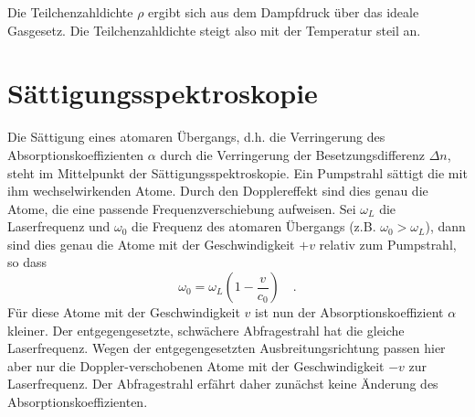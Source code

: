 Die Teilchenzahldichte $\rho$ ergibt sich aus dem Dampfdruck über das ideale Gasgesetz. Die Teilchenzahldichte steigt also mit der Temperatur steil an.


\begin{questions}
\end{questions}


\section{Sättigungsspektroskopie}

\begin{marginfigure}[0mm]
	\caption{oben: Ein Laser der Frequenz $\omega = \omega_0 (1 - v_0/c_0)$ brennt ein Loch in die ansonsten Maxwell-förmige Geschwindigkeitsverteilung der Atome im Grundzustand. unten: Dies führt zum Lamb-Dip im Absorptionsspektrum des gegenläufigen Abfrage-Strahls.}
\end{marginfigure}

Die Sättigung eines atomaren Übergangs, d.h. die Verringerung des Absorptionskoeffizienten $\alpha$ durch die Verringerung der Besetzungsdifferenz $\Delta n$, steht im Mittelpunkt der Sättigungsspektroskopie.  Ein Pumpstrahl sättigt die mit ihm wechselwirkenden Atome. Durch den Dopplereffekt sind dies genau die Atome, die eine passende Frequenzverschiebung aufweisen. Sei $\omega_L$ die Laserfrequenz und $\omega_0$ die Frequenz des atomaren Übergangs (z.B. $\omega_0 > \omega_L$), dann sind dies genau die Atome mit der Geschwindigkeit $+v$ relativ zum Pumpstrahl, so dass
\begin{equation}
	\omega_0 = \omega_L \left( 1 - \frac{v}{c_0} \right) \quad .
\end{equation}
Für diese Atome mit der Geschwindigkeit $v$ ist nun der Absorptionskoeffizient $\alpha$ kleiner. Der entgegengesetzte, schwächere Abfragestrahl hat die gleiche Laserfrequenz. Wegen der entgegengesetzten Ausbreitungsrichtung passen hier aber nur die Doppler-verschobenen Atome mit der Geschwindigkeit $-v$ zur Laserfrequenz. Der Abfragestrahl erfährt daher zunächst keine Änderung des Absorptionskoeffizienten.



